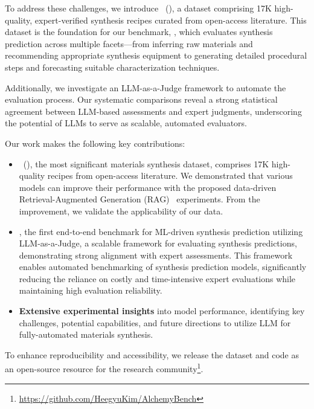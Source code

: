 




To address these challenges, we introduce \oursdatalong~(\oursdatashort), a dataset comprising 17K high-quality, expert-verified synthesis recipes curated from open-access literature. This dataset is the foundation for our benchmark, \oursbench, which evaluates synthesis prediction across multiple facets—from inferring raw materials and recommending appropriate synthesis equipment to generating detailed procedural steps and forecasting suitable characterization techniques.

Additionally, we investigate an LLM-as-a-Judge framework to automate the evaluation process. Our systematic comparisons reveal a strong statistical agreement between LLM-based assessments and expert judgments, underscoring the potential of LLMs to serve as scalable, automated evaluators.

Our work makes the following key contributions:
\begin{itemize}
    \item \oursdatalong~(\oursdatashort), the most significant materials synthesis dataset, comprises 17K high-quality recipes from open-access literature. We demonstrated that various models can improve their performance with the proposed data-driven Retrieval-Augmented Generation (RAG)~\cite{lewis2020retrieval} experiments. From the improvement, we validate the applicability of our data.

    \item \oursbench, the first end-to-end benchmark for ML-driven synthesis prediction utilizing LLM-as-a-Judge, a scalable framework for evaluating synthesis predictions, demonstrating strong alignment with expert assessments. This framework enables automated benchmarking of synthesis prediction models, significantly reducing the reliance on costly and time-intensive expert evaluations while maintaining high evaluation reliability.
    
    \item \textbf{Extensive experimental insights} into model performance, identifying key challenges, potential capabilities, and future directions to utilize LLM for fully-automated materials synthesis.
    
\end{itemize}
To enhance reproducibility and accessibility, we release the dataset and code as an open-source resource for the research community\footnote{\url{https://github.com/HeegyuKim/AlchemyBench}}.





